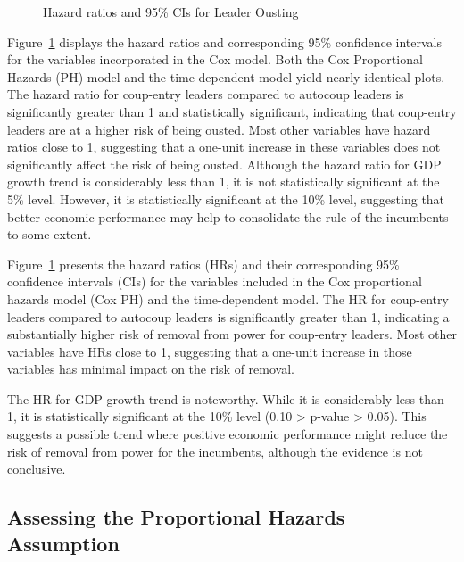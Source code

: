 \documentclass[
  12pt,
]{report}
\begin{document}
\begin{figure}
\begin{minipage}{0.50\linewidth}
{}


\end{minipage}%

\caption{\label{fig-coxHR}Hazard ratios and 95\% CIs for Leader Ousting}

\end{figure}%

Figure~\ref{fig-coxHR} displays the hazard ratios and corresponding 95\%
confidence intervals for the variables incorporated in the Cox model.
Both the Cox Proportional Hazards (PH) model and the time-dependent
model yield nearly identical plots. The hazard ratio for coup-entry
leaders compared to autocoup leaders is significantly greater than 1 and
statistically significant, indicating that coup-entry leaders are at a
higher risk of being ousted. Most other variables have hazard ratios
close to 1, suggesting that a one-unit increase in these variables does
not significantly affect the risk of being ousted. Although the hazard
ratio for GDP growth trend is considerably less than 1, it is not
statistically significant at the 5\% level. However, it is statistically
significant at the 10\% level, suggesting that better economic
performance may help to consolidate the rule of the incumbents to some
extent.

Figure~\ref{fig-coxHR} presents the hazard ratios (HRs) and their
corresponding 95\% confidence intervals (CIs) for the variables included
in the Cox proportional hazards model (Cox PH) and the time-dependent
model. The HR for coup-entry leaders compared to autocoup leaders is
significantly greater than 1, indicating a substantially higher risk of
removal from power for coup-entry leaders. Most other variables have HRs
close to 1, suggesting that a one-unit increase in those variables has
minimal impact on the risk of removal.

The HR for GDP growth trend is noteworthy. While it is considerably less
than 1, it is statistically significant at the 10\% level (0.10
\textgreater{} p-value \textgreater{} 0.05). This suggests a possible
trend where positive economic performance might reduce the risk of
removal from power for the incumbents, although the evidence is not
conclusive.

\subsection{Assessing the Proportional Hazards
Assumption}\label{assessing-the-proportional-hazards-assumption}
\end{document}
